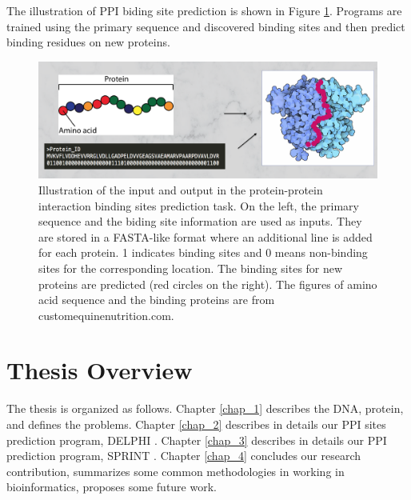The illustration of PPI biding site prediction is shown in Figure \ref{fig_ppi_bind_work_flow}. Programs are trained using the primary sequence and discovered binding sites and then predict binding residues on new proteins.
\begin{figure}[h!]
\begin{center}
\includegraphics[width = 15cm]{img/PPI_site_pred_input.png}
\end{center}
\caption[Illustration of protein-protein interaction binding sites prediction]{Illustration of the input and output in the protein-protein interaction binding sites prediction task. On the left, the primary sequence and the biding site information are used as inputs. They are stored in a FASTA-like format where an additional line is added for each protein. 1 indicates binding sites and 0 means non-binding sites for the corresponding location. The binding sites for new proteins are predicted (red circles on the right). The figures of amino acid sequence and the binding proteins are from customequinenutrition.com. \label{fig_ppi_bind_work_flow}}
\end{figure}

\section{Thesis Overview}
The thesis is organized as follows. Chapter \ref{chap_1} describes the DNA, protein, and defines the problems. Chapter \ref{chap_2} describes in details our PPI sites prediction program, DELPHI \cite{li2020delphi, li2020delphi_ISMB}. Chapter \ref{chap_3} describes in details our PPI prediction program, SPRINT \cite{li2017sprint, li2020predicting}. Chapter \ref{chap_4} concludes our research contribution, summarizes some common methodologies in working in bioinformatics, proposes some future work.

